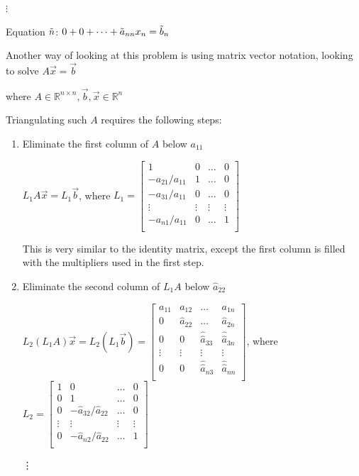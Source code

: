 \documentclass{article}
\begin{document}
 \hspace{2cm} $\vdots$

Equation $\Tilde{n}$: $0 +  0 + \dots + \Tilde{a}_{nn} x_n = \Tilde{b}_n$

\vspace{0.2cm}

Another way of looking at this problem is using matrix vector notation, looking to solve $A \Vec{x} = \Vec{b}$

where $A \in \mathbb R^{n \times n}, \Vec{b}, \Vec{x} \in \mathbb R^n$

Triangulating such $A$ requires the following steps:

\begin{enumerate}
    \item Eliminate the first column of $A$ below $a_{11}$
    
    $L_1 A \Vec{x} = L_1 \Vec{b}$, where $L_1 = \begin{bmatrix}
    1 & 0 & \dots & 0\\
    -a_{21}/a_{11} & 1 & \dots & 0\\
    -a_{31}/a_{11} & 0 & \dots & 0\\
    \vdots & \vdots & \vdots & \vdots\\
    -a_{n1}/a_{11} & 0 & \dots & 1\\
    \end{bmatrix}$
    
    This is very similar to the identity matrix, except the first column is filled with the multipliers used in the first step.
    
    \item Eliminate the second column of $L_1 A$ below $\hat{a}_{22}$
    
    $L_2 (L_1 A) \Vec{x} = L_2(L_1 \Vec{b}) = \begin{bmatrix}
    a_{11} & a_{12} &  \dots & a_{1n}\\
    0 & \hat{a}_{22} & \dots & \hat{a}_{2n}\\
    0 & 0 & \hat{\hat{a}}_{33} & \hat{\hat{a}}_{3n}\\ 
    \vdots & \vdots & \vdots & \vdots\\
    0 & 0 & \hat{\hat{a}}_{n3} & \hat{\hat{a}}_{nn}\\
    \end{bmatrix}$, where $L_2 = \begin{bmatrix}
    1 & 0 & \dots & 0\\
    0 & 1 & \dots & 0\\
    0 &  -\hat{a}_{32}/\hat{a}_{22}& \dots & 0\\
    \vdots & \vdots & \vdots & \vdots\\
    0 & -\hat{a}_{n2}/\hat{a}_{22} & \dots & 1\\
    \end{bmatrix}$
    
    
    \vdots
\end{enumerate}
\end{document}
